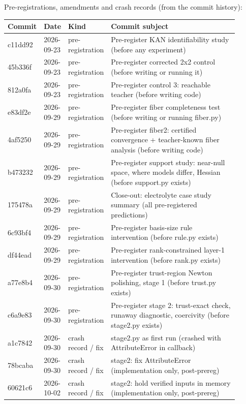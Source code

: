 \noindent Pre-registrations, amendments and crash records (from the commit history):

{\footnotesize\setlength{\tabcolsep}{3pt}
\begin{longtable}{R{0.08\linewidth} R{0.10\linewidth} R{0.14\linewidth} R{0.58\linewidth}}
\toprule
Commit & Date & Kind & Commit subject \\
\midrule
\endhead
c11dd92 & 2026-09-23 & pre-registration & Pre-register KAN identifiability study (before any experiment) \\
45b336f & 2026-09-23 & pre-registration & Pre-register corrected 2x2 control (before writing or running it) \\
812a0fa & 2026-09-23 & pre-registration & Pre-register control 3: reachable teacher (before writing code) \\
e83df2e & 2026-09-29 & pre-registration & Pre-register fiber completeness test (before writing or running fiber.py) \\
4af5250 & 2026-09-29 & pre-registration & Pre-register fiber2: certified convergence + teacher-known fiber analysis (before writing code) \\
b473232 & 2026-09-29 & pre-registration & Pre-register support study: near-null space, where models differ, Hessian (before support.py exists) \\
175478a & 2026-09-29 & pre-registration & Close-out: electrolyte case study summary (all pre-registered predictions) \\
6c93bf4 & 2026-09-29 & pre-registration & Pre-register basis-size rule intervention (before rule.py exists) \\
df44ead & 2026-09-29 & pre-registration & Pre-register rank-constrained layer-1 intervention (before rank.py exists) \\
a77e8b4 & 2026-09-30 & pre-registration & Pre-register trust-region Newton polishing, stage 1 (before trust.py exists) \\
c6a9e83 & 2026-09-30 & pre-registration & Pre-register stage 2: trust-exact check, runaway diagnostic, coercivity (before stage2.py exists) \\
a1c7842 & 2026-09-30 & crash record / fix & stage2.py as first run (crashed with AttributeError in callback) \\
78bcaba & 2026-09-30 & crash record / fix & stage2: fix AttributeError (implementation only, post-prereg) \\
60621c6 & 2026-10-02 & crash record / fix & stage2: hold verified inputs in memory (implementation only, post-prereg) \\

\end{longtable}}
